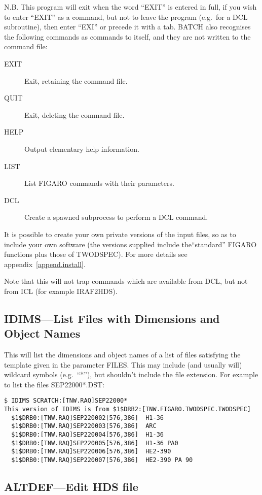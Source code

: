N.B. This program will exit when the word ``EXIT'' is entered in full,
if you wish to enter ``EXIT'' as a command, but not to leave the program
(e.g.\ for a DCL subroutine), then enter ``EXI'' or precede it with a
tab. BATCH also recognises the following commands as commands to itself,
and they are not written to the command file:
\begin{description}
\item[EXIT] Exit, retaining the command file.
\item[QUIT] Exit, deleting the command file.
\item[HELP] Output elementary help information.
\item[LIST] List FIGARO commands with their parameters.
\item[DCL] Create a spawned subprocess to perform a DCL command.
\end{description}

It is possible to create your own private versions of the input files,
so as to include your own software (the versions supplied include
the``standard'' FIGARO functions plus those of TWODSPEC).
For more details see appendix~\ref{append.install}.

Note that this will not trap commands which are available from DCL, but
not from ICL (for example IRAF2HDS).

\subsection{IDIMS---List Files with Dimensions and Object Names}

This will list the dimensions and object names of a list of files
satisfying the template given in the parameter FILES. This may include
(and usually will) wildcard symbols (e.g.\ ``*''), but shouldn't include
the file extension. For example to list the files SEP22000*.DST:
\begin{verbatim}
$ IDIMS SCRATCH:[TNW.RAQ]SEP22000*
This version of IDIMS is from $1$DRB2:[TNW.FIGARO.TWODSPEC.TWODSPEC]
  $1$DRB0:[TNW.RAQ]SEP220002[576,386]  H1-36
  $1$DRB0:[TNW.RAQ]SEP220003[576,386]  ARC
  $1$DRB0:[TNW.RAQ]SEP220004[576,386]  H1-36
  $1$DRB0:[TNW.RAQ]SEP220005[576,386]  H1-36 PA0
  $1$DRB0:[TNW.RAQ]SEP220006[576,386]  HE2-390
  $1$DRB0:[TNW.RAQ]SEP220007[576,386]  HE2-390 PA 90
\end{verbatim}

\subsection{ALTDEF---Edit HDS file}
\label{altdef}

